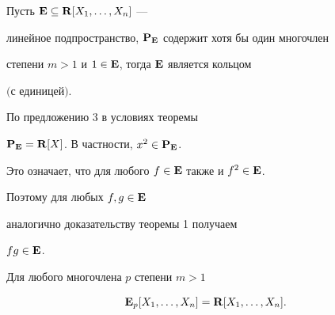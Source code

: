 \begin{thm} Пусть $\bold E \subseteq \bold R [X_1,\dotsc,X_n]$ ---


линейное подпространство, $\bold P_{\bold E}$ содержит хотя бы один многочлен


степени $m>1$ и $1 \in \bold E$, тогда $\bold E$ является кольцом


$($с единицей$)$.


\end{thm}





\begin{pf} По предложению 3 в условиях теоремы


$\bold P_{\bold E}=\bold R [X]$. В частности, $x^2 \in \bold P_{\bold E}$.


Это означает, что для любого $f \in \bold E$ также и $f^2 \in \bold E$.


Поэтому для любых $f,g \in \bold E$


аналогично доказательству теоремы 1 получаем


$fg \in {\bold E}$.


\end{pf}





\begin{thm} Для любого многочлена $p$ степени $m>1$


$$


{\bold E}_p[X_1,\dotsc,X_n] ={\bold R}[X_1,\dotsc,X_n].


$$


\end{thm}





